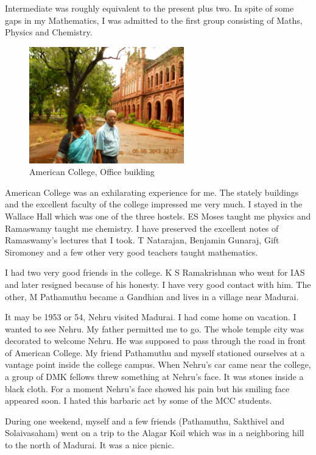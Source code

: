 Intermediate was roughly equivalent to the present plus two. In spite of 
some gaps in my Mathematics, I was admitted to the first group 
consisting of Maths, Physics and Chemistry.
\medskip

\begin{figure}[H]
\centering
\includegraphics[width=0.6\textwidth]{images/new-images/05-Rajaji-AC.jpg}
\caption{American College, Office building}
\end{figure}

American College was an exhilarating experience for me. The stately 
buildings and the excellent faculty of the college impressed me very 
much. I stayed in the Wallace Hall which was one of the three hostels. 
ES Moses taught me physics and Ramaswamy taught me chemistry. I have 
preserved the excellent notes of Ramaswa\-my's lectures that I took. T 
Natarajan, Benjamin Guna\-raj, Gift Siromoney and a few other very good 
teachers taught mathematics.

I had two very good friends in the college. K S Ramakrishnan who went 
for IAS and later resigned because of his honesty. I have very good 
contact with him. The other, M Pathamuthu became a Gandhian and lives in 
a village near Madurai.

It may be 1953 or 54, Nehru visited Madurai. I had come home on 
vacation. I wanted to see Nehru. My father permitted me to go. The whole 
temple city was decorated to welcome Nehru. He was supposed to pass 
through the road in front of American College. My friend Pathamuthu and 
myself stationed ourselves at a vantage point inside the college campus. 
When Nehru's car came near the college, a group of DMK fellows threw 
something at Nehru's face. It was stones inside a black cloth. For a 
moment Nehru's face showed his pain but his smiling face appeared soon. 
I hated this barbaric act by some of the MCC students.

During one weekend, myself and a few friends (Pathamuthu, Sakthivel and 
Solaivasaham) went on a trip to the Alagar Koil which was in a 
neighboring hill to the north of Madurai. It was a nice picnic.

